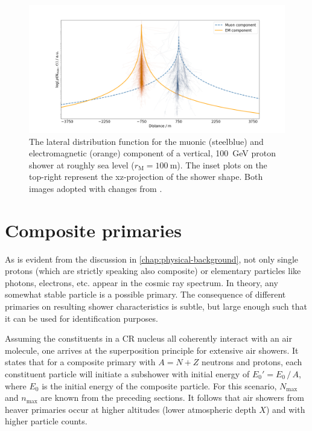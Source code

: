 \begin{figure}
	\centering
	\includegraphics[width=1.0\textwidth]{./plots/componentwise_LDF.png}
	\caption{The lateral distribution function for the muonic (steelblue) and electromagnetic (orange) component of a vertical, \SI{100}{\giga\electronvolt}
	proton shower at roughly sea level ($r_\text{M}=\SI{100}{\meter}$). The inset plots on the top-right represent the xz-projection of the shower shape. Both 
	images adopted with changes from \cite{CorsikaShower}.}
	\label{fig:component-LDF}
\end{figure}

\section{Composite primaries}
\label{sec:superposition-principle}

As is evident from the discussion in \autoref{chap:physical-background}, not only single protons (which are strictly speaking also composite) or elementary 
particles like photons, electrons, etc. appear in the cosmic ray spectrum. In theory, any somewhat stable particle is a possible primary. The consequence of 
different primaries on resulting shower characteristics is subtle, but large enough such that it can be used for identification purposes.

Assuming the constituents in a CR nucleus all coherently interact with an air molecule, one arrives at the superposition principle for extensive air showers. It 
states that for a composite primary with $A = N + Z$ neutrons and protons, each constituent particle will initiate a subshower with initial energy of 
$E_0' = E_0\,/\,A$, where $E_0$ is the initial energy of the composite particle. For this scenario, $N_\text{max}$ and $n_\text{max}$ are known from the preceding
sections. It follows that air showers from heaver primaries occur at higher altitudes (lower atmospheric depth $X$) and with higher particle counts.

